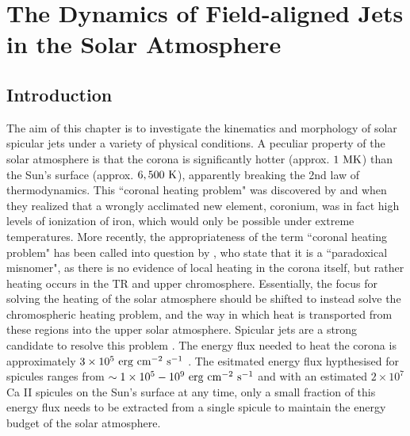 \chapter{The Dynamics of Field-aligned Jets in the Solar Atmosphere}
\label{chap:sj}
\let\thefootnote\relax{}
\section{Introduction}
\label{sec:c2intro}
The aim of this chapter is to investigate the kinematics and morphology of solar spicular jets under a variety of physical conditions. A peculiar property of the solar atmosphere is that the corona is significantly hotter (approx. $1~\rm{MK}$) than the Sun's surface (approx. $6,500~\rm{K}$), apparently breaking the 2nd law of thermodynamics. This ``coronal heating problem" was discovered by \cite{Grotrian1939} and \cite{Edl1943} when they realized that a wrongly acclimated new element, coronium, was in fact high levels of ionization of iron, which would only be possible under extreme temperatures. More recently, the appropriateness of the term ``coronal heating problem" has been called into question by \cite{Aschwanden2007ApJ}, who state that it is a ``paradoxical misnomer", as there is no evidence of local heating in the corona itself, but rather heating occurs in the TR and upper chromosphere. Essentially, the focus for solving the heating of the solar atmosphere should be shifted to instead solve the chromospheric heating problem, and the way in which heat is transported from these regions into the upper solar atmosphere. Spicular jets are a strong candidate to resolve this problem \citep{Kudoh1999ApJ514493K, Pontieu2007PASJ, Martinez-Sykora2017,Moore2011ApJ731L18M, Pontieu2017ApJ, Samanta2019Sci, Zuo2019AcASn, Bale2019Natur}. The energy flux needed to heat the corona is approximately $3\times10^{5}~\rm{erg~cm^{-2}~s^{-1}}$ \citep{Withbroe1977ARAA15363W}. The esitmated energy flux hypthesised for spicules ranges from $\sim 1\times10^5-10^9~\rm{erg~cm^{-2}~s^{-1}}$  \citep{Athay1982ApJ255743A,Zaqarashvili_2009SSRv,dePontieu2011Sci33155D} and with an estimated $2 \times 10^{7}$ \citep{Judge_2010ApJ} Ca II spicules on the Sun's surface at any time, only a small fraction of this energy flux needs to be extracted from a single spicule to maintain the energy budget of the solar atmosphere. \np

